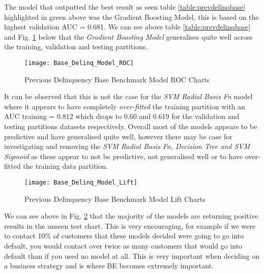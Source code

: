 The model that outputted the best result as seen table \ref{table:prevdelinqbase} highlighted in green above  was the Gradient Boosting Model, this is based on the highest validation AUC = 0.681. We can see above table \ref{table:prevdelinqbase} and Fig. \ref{fig:Delinq_Model_ROC} below that the \textit{Gradient Boosting Model} generalises quite well across the training, validation and testing partitions.

\begin{figure}[H]
	\texttt{[image: Base\_Delinq\_Model\_ROC]}
	\caption{Previous Delinquency Base Benchmark Model ROC Charts}
	\label{fig:Delinq_Model_ROC}
\end{figure}

It can be observed that this is not the case for the \textit{SVM Radial Basis Fn} model where it appears to have completely \textit{over-fitted} the training partition with an AUC training = 0.812 which drops to 0.60 and 0.619 for the validation and testing partitions datasets respectively. Overall most of the models appears to be predictive and have generalised quite well, however there may be case for investigating and removing the \textit{SVM Radial Basis Fn, Decision Tree and SVM Sigmoid} as these appear to not be predictive, not generalised well or to have over-fitted the training data partition. 

\begin{figure}[H]
	\texttt{[image: Base\_Delinq\_Model\_Lift]}
	\caption{Previous Delinquency Base Benchmark Model Lift Charts}
	\label{fig:Delinq_Model_Lift}
\end{figure}

We can see above in Fig. \ref{fig:Delinq_Model_Lift} that the majority of the models are returning positive results in the unseen test chart. This is very encouraging, for example if we were to contact 10\% of customers that these models decided were going to go into default, you would contact over twice as many customers that would go into default than if you used no model at all. This is very important when deciding on a business strategy and is where BE becomes extremely important. 

